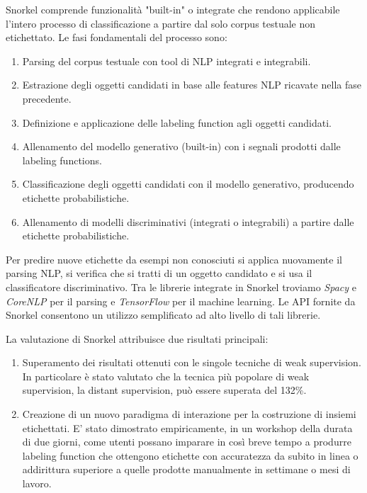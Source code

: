 Snorkel comprende funzionalità "built-in" o integrate che rendono applicabile l'intero processo di classificazione a partire dal solo corpus testuale non etichettato. Le fasi fondamentali del processo sono:
\begin{enumerate}
\item Parsing del corpus testuale con tool di NLP integrati e integrabili.
\item Estrazione degli oggetti candidati in base alle features NLP ricavate nella fase precedente.
\item Definizione e applicazione delle labeling function agli oggetti candidati.
\item Allenamento del modello generativo (built-in) con i segnali prodotti dalle labeling functions.
\item Classificazione degli oggetti candidati con il modello generativo, producendo etichette probabilistiche.
\item Allenamento di modelli discriminativi (integrati o integrabili) a partire dalle etichette probabilistiche.
\end{enumerate}
Per predire nuove etichette da esempi non conosciuti si applica nuovamente il parsing NLP, si verifica che si tratti di un oggetto candidato e si usa il classificatore discriminativo. Tra le librerie integrate in Snorkel troviamo \textit{Spacy} e \textit{CoreNLP} per il parsing e \textit{TensorFlow} per il machine learning. Le API fornite da Snorkel consentono un utilizzo semplificato ad alto livello di tali librerie.

La valutazione di Snorkel attribuisce due risultati principali:
\begin{enumerate}
\item Superamento dei risultati ottenuti con le singole tecniche di weak supervision. In particolare è stato valutato che la tecnica più popolare di weak supervision, la distant supervision, può essere superata del 132\%.
\item Creazione di un nuovo paradigma di interazione per la costruzione di insiemi etichettati. E' stato dimostrato empiricamente, in un workshop della durata di due giorni, come utenti possano imparare in così breve tempo a produrre labeling function che ottengono etichette con accuratezza da subito in linea o addirittura superiore a quelle prodotte manualmente in settimane o mesi di lavoro.
\end{enumerate}

